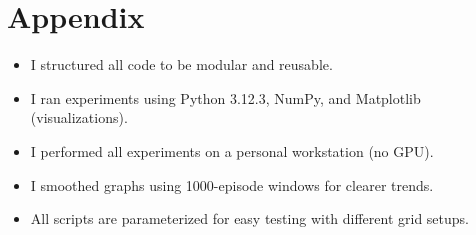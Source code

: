 \documentclass[12pt]{article}
\begin{document}
\section{Appendix}
\begin{itemize}
  \item I structured all code to be modular and reusable.
  \item I ran experiments using Python 3.12.3, NumPy, and Matplotlib (visualizations).
  \item I performed all experiments on a personal workstation (no GPU).
  \item I smoothed graphs using 1000-episode windows for clearer trends.
  \item All scripts are parameterized for easy testing with different grid setups.
\end{itemize}
\end{document}
